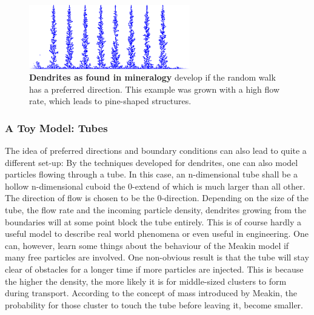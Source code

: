 \documentclass[twocolumn,10pt]{scrartcl}
\begin{document}
                \begin{figure}
                    \center
                    \includegraphics[width=7cm]{img/dendrites.png}
                    \caption[Dendrites as found in mineralogy]
                        {\small\textbf{Dendrites as found in mineralogy} develop if the random walk has a preferred
                        direction. This example was grown with a high flow rate, which leads to pine-shaped
                        structures.}
                    \label{fig-dendrites}
                \end{figure}

            \subsubsection{A Toy Model: Tubes}
                The idea of preferred directions and boundary conditions can also lead to quite a different set-up:
                By the techniques developed for dendrites, one can also model particles flowing through a tube. In
                this case, an n-dimensional tube shall be a hollow n-dimensional cuboid the 0-extend of which is much
                larger than all other. The direction of flow is chosen to be the 0-direction. Depending on the size of
                the tube, the flow rate and the incoming particle density, dendrites growing from the boundaries will
                at some point block the tube entirely. This is of course hardly a useful model to describe real world
                phenomena or even useful in engineering. One can, however, learn some things about the behaviour of the
                Meakin model if many free particles are involved. One non-obvious result is that the tube will stay
                clear of obstacles for a longer time if more particles are injected. This is because the higher the
                density, the more likely it is for middle-sized clusters to form during transport. According to the
                concept of mass introduced by Meakin, the probability for those cluster to touch the tube before
                leaving it, become smaller.
\end{document}

